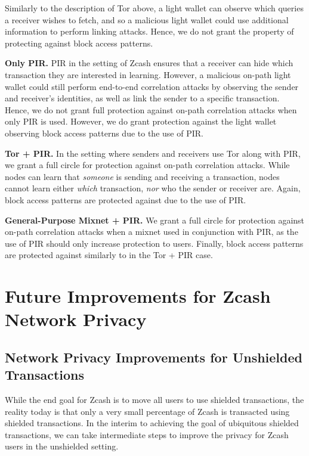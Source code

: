 \documentclass{article}
\begin{document}
Similarly to the description of Tor above, a light wallet can observe which
queries a receiver wishes to fetch, and so a malicious light wallet could use
additional information to perform linking attacks. Hence, we do not grant the
property of protecting against block access patterns.

\textbf{Only PIR.}
PIR in the setting of Zcash ensures that a receiver can hide which transaction
they are interested in learning. However, a malicious on-path light wallet
could still perform end-to-end correlation attacks by observing the sender and
receiver's identities, as well as link the sender to a specific transaction.
Hence, we do not grant full protection against on-path correlation attacks when
only PIR is used. However, we do grant protection against the light wallet
observing block access patterns due to the use of PIR.

\textbf{Tor + PIR.}
In the setting where senders and receivers use Tor along with PIR, we grant a
full circle for protection against on-path correlation
attacks.
While nodes can learn that \emph{someone} is sending and receiving a
transaction, nodes cannot learn either \emph{which} transaction, \emph{nor} who
the sender or receiver are.
Again, block access patterns are protected against due to the use of PIR.

\textbf{General-Purpose Mixnet + PIR.}
We grant a full circle for protection against on-path
correlation attacks when a mixnet used in conjunction with PIR, as the use of
PIR should only increase protection to users.
Finally, block access patterns are protected against similarly to in the Tor +
PIR case.

\section{Future Improvements for Zcash Network Privacy}
\label{future-improvements}

\subsection{Network Privacy Improvements for Unshielded Transactions}

While the end goal for Zcash is to move all users to use shielded transactions,
the reality today is that only a very small percentage of Zcash is transacted
using shielded transactions. In the interim to achieving the goal of
ubiquitous shielded transactions, we can take intermediate steps to improve
the privacy for Zcash users in the unshielded setting.
\end{document}
